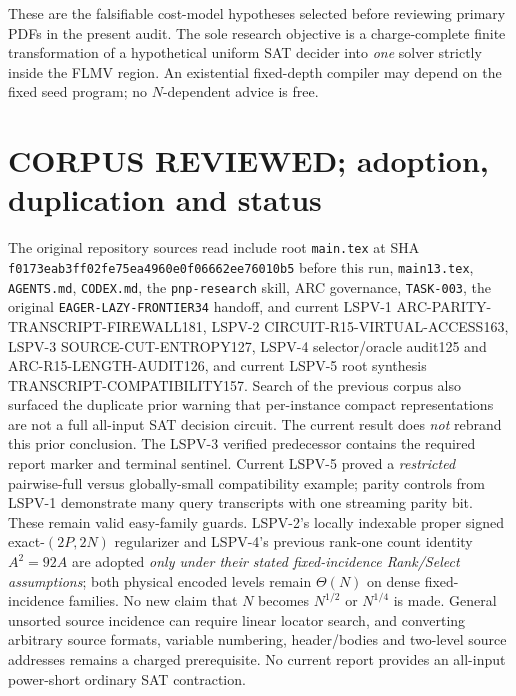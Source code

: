 \documentclass[11pt]{article}
\begin{document}
These are the falsifiable cost-model hypotheses selected before reviewing primary PDFs in the present audit. The sole research objective is a charge-complete finite transformation of a hypothetical uniform SAT decider into \emph{one} solver strictly inside the FLMV region. An existential fixed-depth compiler may depend on the fixed seed program; no $N$-dependent advice is free.

\section{CORPUS REVIEWED; adoption, duplication and status}
The original repository sources read include root \texttt{main.tex} at SHA \texttt{f0173eab3ff02fe75ea4960e0f06662ee76010b5} before this run, \texttt{main13.tex}, \texttt{AGENTS.md}, \texttt{CODEX.md}, the \texttt{pnp-research} skill, ARC governance, \texttt{TASK-003}, the original \texttt{EAGER-LAZY-FRONTIER34} handoff, and current LSPV-1 ARC-PARITY-TRANSCRIPT-FIREWALL181, LSPV-2 CIRCUIT-R15-VIRTUAL-ACCESS163, LSPV-3 SOURCE-CUT-ENTROPY127, LSPV-4 selector/oracle audit125 and ARC-R15-LENGTH-AUDIT126, and current LSPV-5 root synthesis TRANSCRIPT-COMPATIBILITY157. Search of the previous corpus also surfaced the duplicate prior warning that per-instance compact representations are not a full all-input SAT decision circuit. The current result does \emph{not} rebrand this prior conclusion.
The LSPV-3 verified predecessor contains the required report marker and terminal sentinel. Current LSPV-5 proved a \emph{restricted} pairwise-full versus globally-small compatibility example; parity controls from LSPV-1 demonstrate many query transcripts with one streaming parity bit. These remain valid easy-family guards.
LSPV-2's locally indexable proper signed exact-$(2P,2N)$ regularizer and LSPV-4's previous rank-one count identity $A^2=92A$ are adopted \emph{only under their stated fixed-incidence Rank/Select assumptions}; both physical encoded levels remain $\Theta(N)$ on dense fixed-incidence families. No new claim that $N$ becomes $N^{1/2}$ or $N^{1/4}$ is made. General unsorted source incidence can require linear locator search, and converting arbitrary source formats, variable numbering, header/bodies and two-level source addresses remains a charged prerequisite. No current report provides an all-input power-short ordinary SAT contraction.
\end{document}
